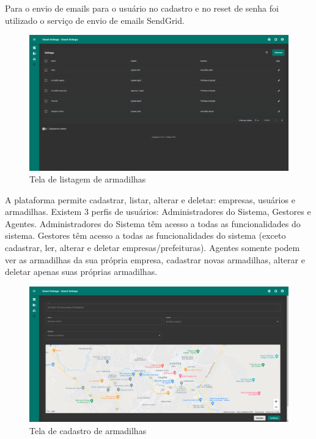 \documentclass[
	12pt,				%
	openright,			%
	oneside,			%
	a4paper,			%
	chapter=TITLE,		%
	english,			%
	brazil				%
	]{abntex2}
\begin{document}
Para o envio de emails para o usuário no cadastro e no reset de senha foi utilizado o serviço de envio de emails SendGrid.


\begin{figure}[H]
    \centering
    \includegraphics[scale=0.20]{imagens/front_4.png}
    \caption{Tela de listagem de armadilhas}
        \label{fig:listagem}
    \end{figure}

A plataforma permite cadastrar, listar, alterar e deletar: empresas, usuários e armadilhas. 
Existem 3 perfis de usuários: Administradores do Sistema, Gestores e Agentes. 
Administradores do Sistema têm acesso a todas as funcionalidades do sistema.
Gestores têm acesso a todas as funcionalidades do sistema (exceto cadastrar, ler, alterar e deletar empresas/prefeituras).
Agentes somente podem ver as armadilhas da sua própria empresa, cadastrar novas armadilhas, alterar e deletar apenas
suas próprias armadilhas.

\begin{figure}[H]
    \centering
    \includegraphics[scale=0.20]{imagens/front_3.png}
    \caption{Tela de cadastro de armadilhas}
        \label{fig:cadastro}
    \end{figure}
\end{document}
